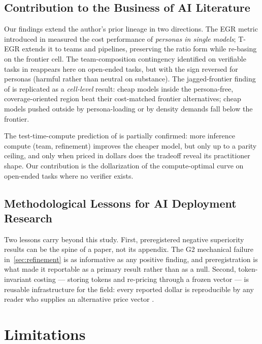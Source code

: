 \documentclass[12pt,a4paper]{article}
\begin{document}
\subsection{Contribution to the Business of AI Literature}

Our findings extend the author's prior lineage in two directions. The EGR metric
introduced in \citet{Hariri2026b} measured the cost performance of \emph{personas
in single models}; T-EGR extends it to teams and pipelines, preserving the ratio
form while re-basing on the frontier cell. The team-composition contingency
identified on verifiable tasks in \citet{Hariri2025b} reappears here on open-ended
tasks, but with the sign reversed for personas (harmful rather than neutral on
substance). The jagged-frontier finding of \citet{DellAcquaEtAl2023} is replicated
as a \emph{cell-level} result: cheap models inside the persona-free,
coverage-oriented region beat their cost-matched frontier alternatives; cheap
models pushed outside by persona-loading or by density demands fall below the
frontier.

The test-time-compute prediction of \citet{SnellEtAl2024} is partially confirmed:
more inference compute (team, refinement) improves the cheaper model, but only up
to a parity ceiling, and only when priced in dollars does the tradeoff reveal its
practitioner shape. Our contribution is the dollarization of the compute-optimal
curve on open-ended tasks where no verifier exists.

\subsection{Methodological Lessons for AI Deployment Research}

Two lessons carry beyond this study. First, preregistered negative superiority
results can be the spine of a paper, not its appendix. The G2 mechanical failure
in~\cref{sec:refinement} is as informative as any positive finding, and
preregistration is what made it reportable as a primary result rather than as a
null. Second, token-invariant costing --- storing tokens and re-pricing through a
frozen vector --- is reusable infrastructure for the field: every reported dollar
is reproducible by any reader who supplies an alternative price vector
\citep{Diewert1976, SandveEtAl2013}.


\section{Limitations}\label{sec:limitations}
\end{document}
